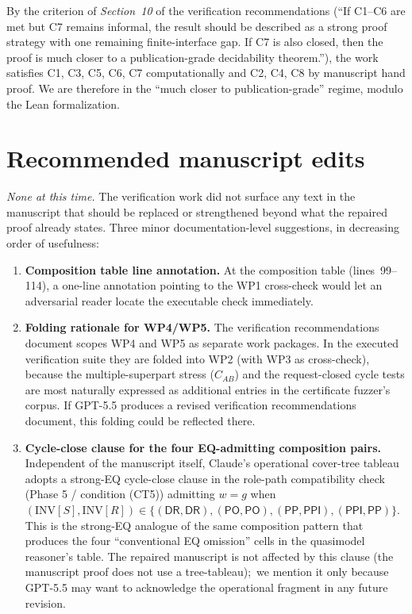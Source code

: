 \documentclass[11pt]{article}
\newcommand{\PP}{\mathsf{PP}}
\newcommand{\PPI}{\mathsf{PPI}}
\newcommand{\PO}{\mathsf{PO}}
\newcommand{\DR}{\mathsf{DR}}
\begin{document}
By the criterion of \emph{Section~10} of the verification
recommendations (``If C1--C6 are met but C7 remains informal, the
result should be described as a strong proof strategy with one
remaining finite-interface gap.  If C7 is also closed, then the
proof is much closer to a publication-grade decidability theorem.''),
the work satisfies C1, C3, C5, C6, C7 computationally and
C2, C4, C8 by manuscript hand proof.  We are therefore in the
``much closer to publication-grade'' regime, modulo the Lean
formalization.

\section{Recommended manuscript edits}

\emph{None at this time.}  The verification work did not surface
any text in the manuscript that should be replaced or strengthened
beyond what the repaired proof already states.  Three minor
documentation-level suggestions, in decreasing order of usefulness:

\begin{enumerate}[leftmargin=2em]
  \item \textbf{Composition table line annotation.}  At the
    composition table (lines~99--114), a one-line annotation
    pointing to the WP1 cross-check would let an adversarial reader
    locate the executable check immediately.
  \item \textbf{Folding rationale for WP4/WP5.}  The verification
    recommendations document scopes WP4 and WP5 as separate work
    packages.  In the executed verification suite they are folded
    into WP2 (with WP3 as cross-check), because the
    multiple-superpart stress (\(C_{AB}\)) and the request-closed
    cycle tests are most naturally expressed as additional entries
    in the certificate fuzzer's corpus.  If GPT-5.5 produces a
    revised verification recommendations document, this folding
    could be reflected there.
  \item \textbf{Cycle-close clause for the four EQ-admitting
    composition pairs.}  Independent of the manuscript itself,
    Claude's operational cover-tree tableau adopts a strong-EQ
    cycle-close clause in the role-path compatibility check (Phase
    5 / condition (CT5)) admitting \(w = g\) when
    \((\mathrm{INV}[S], \mathrm{INV}[R]) \in
       \{(\DR,\DR), (\PO,\PO), (\PP,\PPI), (\PPI,\PP)\}\).
    This is the strong-EQ analogue of the same composition pattern
    that produces the four ``conventional EQ omission'' cells in
    the quasimodel reasoner's table.  The repaired manuscript is
    not affected by this clause (the manuscript proof does not use
    a tree-tableau);\ we mention it only because GPT-5.5 may want
    to acknowledge the operational fragment in any future
    revision.
\end{enumerate}
\end{document}
